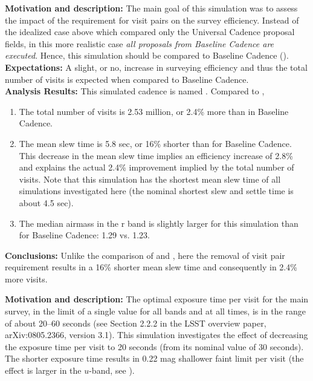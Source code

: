 {\bf Motivation and description:} The main goal of this simulation was
to assess the impact of the requirement for visit pairs on the survey
efficiency. Instead of the idealized case above which compared only
the Universal Cadence proposal fields, in this more realistic case
{\it all proposals from Baseline Cadence are executed}. Hence, this
simulation should be compared to Baseline Cadence
(). \\

{\bf Expectations:} A slight, or no, increase in surveying efficiency
and thus the total number of visits is expected when compared to
Baseline Cadence. \\

{\bf Analysis Results:}  This simulated cadence is named
. Compared to ,
\begin{enumerate}
\item The total number of visits is 2.53 million, or 2.4\% more than
in Baseline Cadence.
\item The mean slew time is 5.8 sec, or 16\% shorter than for Baseline
Cadence. This decrease in the mean slew time implies an efficiency
increase of 2.8\% and explains the actual 2.4\% improvement implied by
the total number of visits.  Note that this simulation has the
shortest mean slew time of all simulations investigated here (the
nominal shortest slew and settle time is about 4.5 sec).
\item The median airmass in the r band is slightly larger for this
simulation than for Baseline Cadence: 1.29 vs. 1.23.
\end{enumerate}


{\bf Conclusions:}
Unlike the comparison of  and
, here the removal of visit pair requirement
results in a 16\% shorter mean slew time and consequently in 2.4\%
more visits.



{\bf Motivation and description:} The optimal exposure time per visit
for the main survey, in the limit of a single value for all bands and
at all times, is in the range of about 20--60 seconds (see Section
2.2.2 in the LSST overview paper, arXiv:0805.2366, version 3.1). This
simulation investigates the effect of decreasing the exposure time per
visit to 20 seconds (from its nominal value of 30 seconds). The
shorter exposure time results in 0.22 mag shallower faint limit per
visit (the effect is larger in the $u$-band, see
). \\

